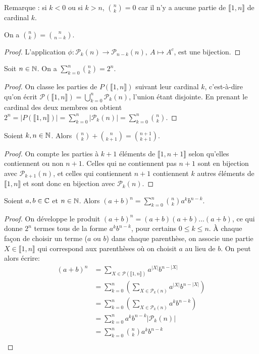 Remarque : si $k<0$ ou si $k>n$, $\binom{n}{k}=0$ car il n'y a aucune partie de $\llbracket 1,n\rrbracket$ de cardinal $k$.

\begin{proposition}
On a $\binom{n}{k} = \binom{n}{n-k}$.
\end{proposition}
\begin{proof}
L'application $\phi : \mathcal P_k(n) \to \mathcal P_{n-k}(n), \: A\mapsto  A^c$, est une bijection.
\end{proof}

\begin{proposition}
Soit $n\in\mathbb{N}$. On a $\sum_{k=0}^n \binom{n}{k} =2^n$.
\end{proposition}
\begin{proof}
On classe les parties de $P(\llbracket 1,n\rrbracket)$ suivant leur cardinal $k$, c'est-à-dire qu'on écrit  $\mathcal P(\llbracket 1,n\rrbracket) = \bigcup_{k=0}^n \mathcal P_k(n)$, l'union étant disjointe. En prenant le cardinal des deux membres on obtient $2^n=|P(\llbracket 1,n\rrbracket)| = \sum_{k=0}^n |\mathcal P_k(n)| = \sum_{k=0}^n \binom{n}{k}$.
\end{proof}

\begin{proposition}
Soient $k,n\in \mathbb{N}$. Alors $\binom{n}{k}+\binom{n}{k+1} = \binom{n+1}{k+1}$.
\end{proposition}
\begin{proof}
On compte les parties à $k+1$ éléments de $\llbracket 1,n+1\rrbracket$ selon qu'elles contiennent ou non $n+1$. Celles qui ne contiennent pas $n+1$ sont en bijection avec $\mathcal P_{k+1}(n)$, et celles qui contiennent $n+1$ contiennent $k$ autres éléments de $\llbracket 1,n\rrbracket$ et sont donc en bijection avec $\mathcal P_k(n)$.
\end{proof}

\begin{proposition}
Soient $a, b\in \mathbb{C}$ et $n\in \mathbb{N}$. Alors $(a+b)^n = \sum_{k=0}^n \binom{n}{k} a^k b^{n-k}$.
\end{proposition}
\begin{proof}
On développe le produit $(a+b)^n = (a+b)(a+b)...(a+b)$, ce qui donne $2^n$ termes tous de la forme $a^kb^{n-k}$, pour certains $0\leq k\leq n$.
À chaque façon de choisir un terme ($a$ ou $b$) dans chaque parenthèse, on associe une partie $X \in \llbracket 1,n\rrbracket$ qui correspond aux parenthèses où on choisit $a$ au lieu de $b$. On peut alors écrire:
\begin{align*}
(a+b)^n
&= \sum_{X \in \mathcal P(\llbracket 1,n\rrbracket)} a^{|X|}b^{n-|X|}\\
&= \sum_{k=0}^n \left(\sum_{X\in\mathcal P_k(n)} a^{|X|}b^{n-|X|}\right)\\
&= \sum_{k=0}^n \left( \sum_{X\in\mathcal P_k(n)} a^k b^{n-k}\right)\\
&= \sum_{k=0}^n a^kb^{n-k} \left|\mathcal P_k(n)\right|\\
&= \sum_{k=0}^n \binom{n}{k}a^kb^{n-k}\\
\end{align*}
\end{proof}

